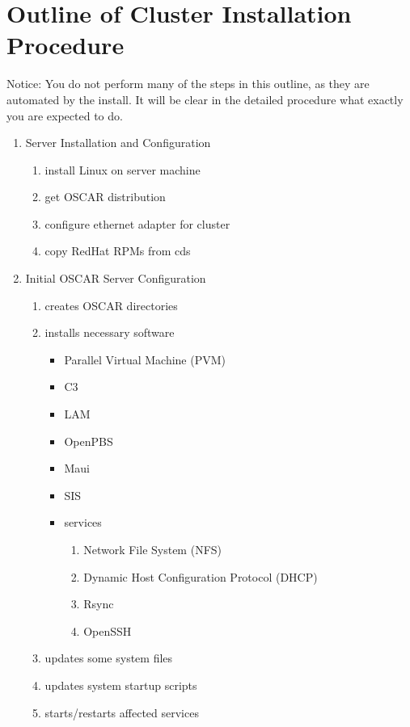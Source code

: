 %
%
%

\section{Outline of Cluster Installation Procedure}

Notice: You do not perform many of the steps in this outline, as they
are automated by the install. It will be clear in the detailed
procedure what exactly you are expected to do.

\begin{enumerate}
        \item Server Installation and Configuration
        \begin{enumerate}
                \item install Linux on server machine
                \item get OSCAR distribution
                \item configure ethernet adapter for cluster
                \item copy RedHat RPMs from cds
        \end{enumerate}

        \item Initial OSCAR Server Configuration
        \begin{enumerate}
                \item creates OSCAR directories
                \item installs necessary software
                \begin{itemize}
                        \item Parallel Virtual Machine (PVM)
                        \item C3
                        \item LAM
                        \item OpenPBS
                        \item Maui
                        \item SIS
                        \item services
                        \begin{enumerate}
                                \item Network File System (NFS)
                                \item Dynamic Host Configuration Protocol (DHCP)
                                \item Rsync
                                \item OpenSSH
                        \end{enumerate}
                \end{itemize}
                \item updates some system files
                \item updates system startup scripts
                \item starts/restarts affected services
        \end{enumerate}


\end{enumerate}
